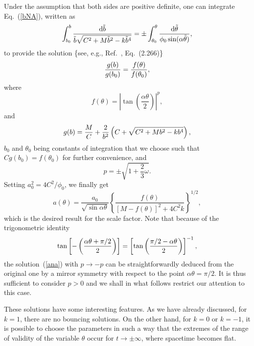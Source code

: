 \documentclass[a4paper,aps,twocolumn,prd,showpacs,nofootinbib]{revtex4}
\newcommand{\dd}{\mathrm{d}}
\begin{document}
Under the assumption that both sides are positive definite, one can
integrate Eq.~(\ref{bNA}), written as
\begin{equation}
\int_{b_0}^{b} {\dd \tilde b \over \tilde b \sqrt{C^2 + M \tilde b^2 -
k \tilde b^4}} = \pm \int_{\theta_0}^\theta {\dd \tilde \theta\over
\phi_0 \sin(\alpha\tilde \theta)}, \label{integr}
\end{equation}
to provide the solution \{see, e.g., Ref.~\cite{Grad}, Eq.~(2.266)\}
\begin{equation}
{g(b)\over g(b_0)} = {f(\theta)\over f(\theta_0)},
\end{equation}
where
\begin{equation}
f(\theta) = \left| \tan
\left(\frac{\alpha\theta}{2}\right)\right|^p,\label{fNA}
\end{equation}
and
\begin{equation}
g(b) = {M\over C} + {2\over b^2} \left( C+\sqrt{C^2 + M b^2
-kb^4}\right),
\end{equation}
$b_0$ and $\theta_0$ being constants of integration that we choose
such that $C g(b_0) = f(\theta_0)$ for further convenience, and
\begin{equation}
p = \pm \sqrt{1 + \frac{2}{3}\omega}.
\end{equation}
Setting $a_0^2 = 4 C^2/\phi_0$, we finally get
\begin{equation}
a(\theta) =
\frac{a_0}{\sqrt{\sin\alpha\theta}}\left\{\frac{f(\theta)}
{\left[M - f(\theta)\right]^2 + 4C^2k}\right\}^{1/2}\label{ana},
\end{equation}
which is the desired result for the scale factor. Note that because
of the trigonometric identity
\begin{equation}
\tan \left[ -\left( {\alpha\theta +\pi/2\over 2}\right) \right] =
\left[ \tan \left( {\pi/2-\alpha\theta \over 2}\right) \right]^{-1},
\end{equation}
the solution~(\ref{ana}) with $p\to -p$ can be straightforwardly
deduced from the original one by a mirror symmetry with respect to the
point $\alpha\theta=\pi/2$. It is thus sufficient to consider $p>0$
and we shall in what follows restrict our attention to this case.

These solutions have some interesting features. As we have already
discussed, for $k = 1$, there are no bouncing solutions. On the other
hand, for $k = 0$ or $k= - 1$, it is possible to choose the parameters
in such a way that the extremes of the range of validity of the
variable $\theta$ occur for $t \rightarrow \pm \infty$, where
spacetime becomes flat.
\end{document}
